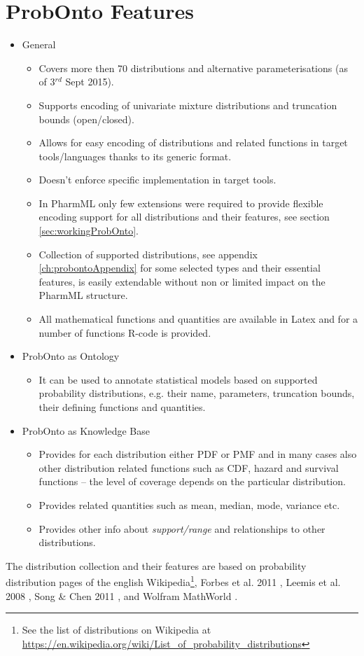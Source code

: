 \section{ProbOnto Features}
\begin{itemize}
\item
General 
\begin{itemize}
\item
Covers more then 70 distributions and alternative parameterisations (as of 3$^{rd}$ Sept 2015).
\item
Supports encoding of univariate mixture distributions and truncation bounds (open/closed).
\item
Allows for easy encoding of distributions and related functions in target 
tools/languages thanks to its generic format.
\item
Doesn't enforce specific implementation in target tools.
\item
In PharmML only few extensions were required to provide flexible encoding support
for all distributions and their features, see section \ref{sec:workingProbOnto}.
\item
Collection of supported distributions, see appendix \ref{ch:probontoAppendix} for 
some selected types and their essential features, is easily extendable 
without non or limited impact on the PharmML structure.
\item
All mathematical functions and quantities are available in Latex and  for a number 
of functions R-code is provided.
\end{itemize}
\item
ProbOnto as Ontology
\begin{itemize}
\item
It can be used to annotate statistical models based on supported probability 
distributions, e.g. their name, parameters, truncation bounds, their defining 
functions and quantities.
\end{itemize}
\item
ProbOnto as Knowledge Base
\begin{itemize}
\item
Provides for each distribution either PDF or PMF and in many cases also 
other distribution related functions such as CDF, hazard and survival functions 
-- the level of coverage depends on the particular distribution. 
\item
Provides related quantities such as mean, median, mode, variance etc.
\item
Provides other info about \emph{support/range} and relationships to other distributions.
\end{itemize}
\end{itemize}
The distribution collection and their features are based on
probability distribution pages of the english Wikipedia\footnote{See the list of 
distributions on Wikipedia at \url{https://en.wikipedia.org/wiki/List_of_probability_distributions}}, 
Forbes et al. 2011 \cite{forbes2011statistical}, Leemis et al. 2008 \cite{Leemis:2008tg}, 
Song \& Chen 2011 \cite{song2011eighty}, and 
Wolfram MathWorld \cite{weisstein2007wolfram}.

